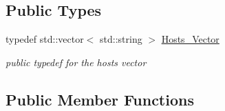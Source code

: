 \subsection*{Public Types}
\begin{DoxyCompactItemize}
\item 
typedef std::vector$<$ std::string $>$ \hyperlink{classMadara_1_1Transport_1_1Base_a2957ae0c413e07b7e276ae69ef1c320a}{Hosts\_\-Vector}
\begin{DoxyCompactList}\small\item\em public typedef for the hosts vector \item\end{DoxyCompactList}\end{DoxyCompactItemize}
\subsection*{Public Member Functions}
